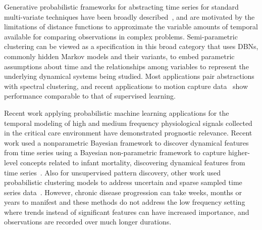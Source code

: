 
Generative probabilistic frameworks for abstracting time series for standard multi-variate techniques have been broadly described~\cite{Cadez00ageneral}, and are motivated by the limitations of distance functions to approximate the variable amounts of temporal available for comparing observations in complex problems.  Semi-parametric clustering can be viewed as a specification in this broad category that uses DBNs, commonly hidden Markov models and their variants, to embed parametric assumptions about time and the relationships among variables to represent the underlying dynamical systems being studied.  Most applications pair abstractions with spectral clustering, and recent applications to motion capture data~\cite{JebSonTha07a} show performance comparable to that of supervised learning.

 Recent work applying probabilistic machine learning applications for the temporal modeling of high and medium frequency physiological signals collected in the critical care environment have demonstrated prognostic relevance.  Recent work used a nonparametric Bayesian framework to discover dynamical features from time series using a Bayesian non-parametric framework to capture higher-level concepts related to infant mortality, discovering dynamical features from time series~\cite{Saria09}. Also for unsupervised pattern discovery, other work used probabilistic clustering models to address uncertain and sparse sampled time series data~\cite{Marlin12}.  However, chronic disease progression can take weeks, months or years to manifest and these methods do not address the low frequency setting where trends instead of significant features can have increased importance, and observations are recorded over much longer durations.